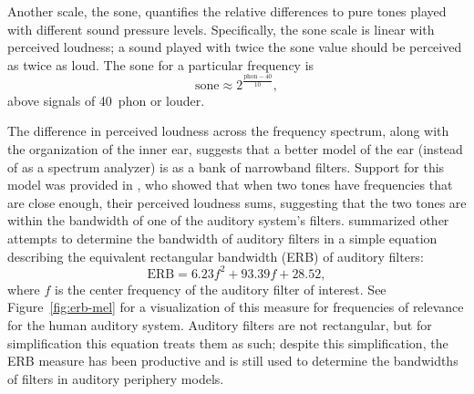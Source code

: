 
Another scale, the sone,
quantifies the relative differences
to pure tones played with
different sound pressure levels.
Specifically, the sone scale
is linear with perceived loudness;
a sound played with twice the sone value
should be perceived as twice as loud.
The sone for a particular frequency is
\begin{equation*}
  \text{sone} \approx 2^{\frac{\text{phon} - 40}{10}},
\end{equation*}
above signals of 40~phon or louder.

The difference in perceived loudness
across the frequency spectrum,
along with the organization
of the inner ear,
suggests that a better model
of the ear (instead of as a spectrum analyzer)
is as a bank of narrowband filters.
Support for this model was provided
in \citet{zwicker1957},
who showed that when two tones
have frequencies that are close enough,
their perceived loudness sums,
suggesting that the two tones
are within the bandwidth of one of the
auditory system's filters.
\citet{moore1983}
summarized other attempts to
determine the bandwidth
of auditory filters
in a simple equation
describing the equivalent
rectangular bandwidth (ERB)
of auditory filters:
\begin{equation*}
  \text{ERB} = 6.23 f^2 + 93.39 f + 28.52,
\end{equation*}
where $f$ is the center frequency
of the auditory filter of interest.
See Figure~\ref{fig:erb-mel} for a visualization of
this measure for frequencies of relevance
for the human auditory system.
Auditory filters are not rectangular,
but for simplification this equation
treats them as such;
despite this simplification,
the ERB measure has been productive and is still used
to determine the bandwidths
of filters in auditory periphery models.



